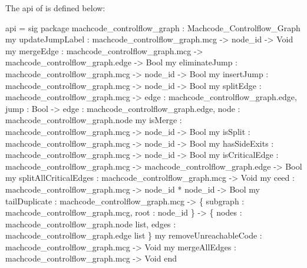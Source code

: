 The api of  is defined below:
\begin{SML}
 api  = sig
    package machcode_controlflow_graph : Machcode_Controlflow_Graph
    my updateJumpLabel : machcode_controlflow_graph.mcg -> node_id -> Void
    my mergeEdge       : machcode_controlflow_graph.mcg -> machcode_controlflow_graph.edge -> Bool
    my eliminateJump   : machcode_controlflow_graph.mcg -> node_id -> Bool
    my insertJump      : machcode_controlflow_graph.mcg -> node_id -> Bool
    my splitEdge  : machcode_controlflow_graph.mcg -> { edge : machcode_controlflow_graph.edge, jump : Bool }
                      -> { edge : machcode_controlflow_graph.edge, node : machcode_controlflow_graph.node }
    my isMerge        : machcode_controlflow_graph.mcg -> node_id -> Bool
    my isSplit        : machcode_controlflow_graph.mcg -> node_id -> Bool
    my hasSideExits   : machcode_controlflow_graph.mcg -> node_id -> Bool
    my isCriticalEdge : machcode_controlflow_graph.mcg -> machcode_controlflow_graph.edge -> Bool
    my splitAllCriticalEdges : machcode_controlflow_graph.mcg -> Void
    my ceed : machcode_controlflow_graph.mcg -> node_id * node_id -> Bool
    my tailDuplicate : machcode_controlflow_graph.mcg -> \{ subgraph : machcode_controlflow_graph.mcg, root : node_id \} 
                                -> \{ nodes : machcode_controlflow_graph.node list, 
                                     edges : machcode_controlflow_graph.edge list \} 
    my removeUnreachableCode : machcode_controlflow_graph.mcg -> Void
    my mergeAllEdges : machcode_controlflow_graph.mcg -> Void
 end
\end{SML}

